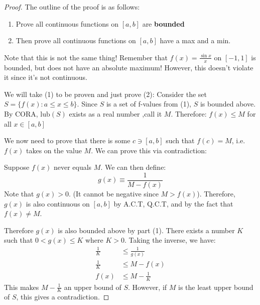 \begin{itemize}
\begin{theorem}
        \begin{proof}
            The outline of the proof is as follows:
            \begin{enumerate}
                \item Prove all continuous functions on $[a,b]$ are \textbf{bounded}
                \item Then prove all continuous functions on $[a,b]$ have a max and a min.
            \end{enumerate}
            Note that this is not the same thing! Remember that $\displaystyle f(x)=\frac{\sin x}{x}$ on $[-1,1]$ is bounded, but does not have an absolute maximum! However, this doesn't violate it since it's not continuous.
            \vspace{2mm}

            We will take (1) to be proven and just prove (2): Consider the set $S=\{f(x): a\le x\le b\}$. Since $S$ is a set of f-values from (1), $S$ is bounded above. By CORA, $\text{lub}(S)$ exists as a real number ,call it $M$. Therefore: $f(x) \le M$ for all $x\in [a,b]$
            \vspace{2mm}

            We now need to prove that there is some $c\ni[a,b]$ such that $f(c)=M$, i.e. $f(x)$ takes on the value $M$. We can prove this via contradiction:
            \vspace{2mm}

            Suppose $f(x)$ never equals $M$. We can then define:
            \begin{equation}
                g(x)\equiv \frac{1}{M-f(x)}
                \label{eq:}
            \end{equation}
            Note that $g(x)>0$. (It cannot be negative since $M > f(x)$). Therefore, $g(x)$ is also continuous on $[a,b]$ by A.C.T, Q.C.T, and by the fact that $f(x)\neq M$.
            \vspace{2mm}

            Therefore $g(x)$ is also bounded above by part (1). There exists a number $K$ such that $0<g(x)\le K$ where $K>0$. Taking the inverse, we have:
            \begin{align}
                \frac{1}{K} &\le \frac{1}{g(x)} \\ 
                \frac{1}{K} &\le M-f(x) \\ 
                f(x) &\le M-\frac{1}{K}
                \label{eq:}
            \end{align}
            This makes $M-\frac{1}{K}$ an upper bound of $S$. However, if $M$ is the least upper bound of $S$, this gives a contradiction.
            \vspace{2mm}


\end{proof}
\end{theorem}
\end{itemize}

